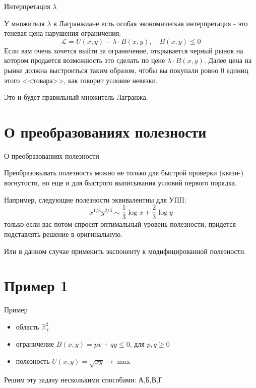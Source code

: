 \documentclass{beamer}
\begin{document}
\begin{frame}{Интерпретация $\lambda$}

У множителя $\lambda$ в Лагранжиане есть особая экономическая интерпретация - это \alert{теневая цена} нарушения ограничения:
$$\mathcal{L} = U(x,y) - \lambda \cdot B(x,y), \quad B(x,y) \leqslant 0$$ 
Если вам очень хочется выйти за ограничение, открывается черный рынок на котором продается возможность это сделать по цене $\lambda \cdot B(x,y)$. Далее цена на рынке должна выстроиться таким образом, чтобы вы покупали ровно 0 единиц этого <<товара>>, как говорит условие невязки. 

Это и будет правильный множитель Лагранжа.
\end{frame}

\section{О преобразованиях полезности}

\begin{frame}{О преобразованиях полезности}

Преобразовывать полезность можно не только для быстрой проверки (квази-) вогнутости, но еще и для быстрого выписывания условий первого порядка. 

Например, следующие полезности эквивалентны для УПП:
$$ x^{1/3}y^{2/3} \sim \frac{1}{3} \log x + \frac{2}{3} \log y$$
только если вас потом спросят оптимальный уровень полезности, придется подставлять решение в оригинальную.

Или в данном случае применить экспоненту к модифицированной полезности. 
\end{frame}

\section{Пример 1}

\begin{frame}{Пример}

\begin{itemize}
  \item область $\mathbb{R}^2_+$
  \item ограничение $B(x,y) = p x + q y \leqslant 0$, для $p,q \geqslant 0$
  \item полезность $U(x,y) = \sqrt{x y} \to \max$
\end{itemize}

Решим эту задачу несколькими способами: А,Б,В,Г

\end{frame}
\end{document}
